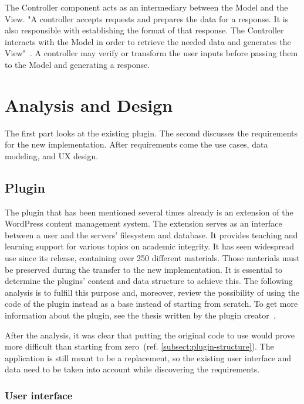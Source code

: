 \documentclass[
  digital,     %
  oneside,     %
  nosansbold,  %
  colorbold, %
  lof,         %
  lot,         %
]{fithesis4}
\newcommand{\cref}[1]{(ref. \ref{#1})}
\begin{document}
The Controller component acts as an intermediary between the Model and the View.
"A controller accepts requests and prepares the data for a response. It is also responsible
with establishing the format of that response. The Controller interacts with the Model in
order to retrieve the needed data and generates the View"~\cite{gilmore09}. A controller
may verify or transform the user inputs before passing them to the Model and generating
a response.

\chapter{Analysis and Design}
\label{chap:analysis}

The first part looks at the existing plugin. The second discusses the requirements for the new
implementation. After requirements come the use cases, data modeling, and UX design.

\section{Plugin}
\label{sect:plugin}

The plugin that has been mentioned several times already is an extension of the WordPress
content management system. The extension serves as an interface between a user and the
servers' filesystem and database. It provides teaching and learning support for various topics
on academic integrity. It has seen widespread use since its release, containing over 250
different materials. Those materials must be preserved during the transfer to the new
implementation. It is essential to determine the plugins' content and data structure to achieve
this. The following analysis is to fulfill this purpose and, moreover, review the possibility of using
the code of the plugin instead as a base instead of starting from scratch. To get more information
about the plugin, see the thesis written by the plugin creator~\cite{lang18}.

After the analysis, it was clear that putting the original code to use would prove more difficult
than starting from zero~\cref{subsect:plugin-structure}. The application is still meant to be
a replacement, so the existing user interface and data need to be taken into account while
discovering the requirements. 

\subsection{User interface}
\label{subsect:plugin-ui}
\end{document}

